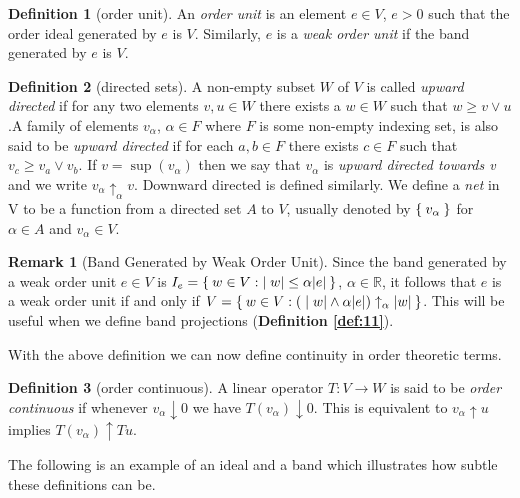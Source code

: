 \documentclass[letterpaper,10pt,oneside,onecolumn,reqno]{amsart}
\newcommand{\R}{\mathbb R}
\theoremstyle{definition}
\newtheorem{defn}{Definition}
\newtheorem{rem}{Remark}
\newcommand{\meet}{\wedge}
\newcommand{\join}{\vee}
\begin{document}
  \begin{defn}[order unit]\label{def:9}
    An \emph{order unit} is an element $e \in V$, $e
    > 0$ such that the order ideal generated by $e$ is $V$. Similarly,
    $e$ is a \emph{weak order unit} if the band
    generated by $e$ is $V$.
  \end{defn}
  \begin{defn}[directed sets]\label{def:10}
    A non-empty subset $W$ of $V$ is called \emph{upward directed} if for any two elements $v,u \in W$
    there exists a $w \in W$ such that $w \geq v \join u$.A family of
    elements $v_{\alpha}$, $\alpha \in F$ where $F$ is some non-empty
    indexing set, is also said to be \emph{upward directed} if for
    each $a,b \in F$ there exists $c \in F$ such that $v_c \geq v_a
    \join v_b$. If $v = \sup({v_\alpha})$ then we say that
    $v_{\alpha}$ is \emph{upward directed towards v} and we write
    $v_{\alpha}\uparrow_{\alpha} v$. Downward directed is defined
    similarly. We define a \emph{net} in V to be a function
    from a directed set $A$ to $V$, usually denoted by
    $\Set{v_{\alpha}}$ for $\alpha \in A$ and $v_{\alpha} \in V$.

    \begin{rem}[Band Generated by Weak Order Unit]\label{rem:3}
      Since the band generated by a weak order unit $e \in V$ is
      $I_{e} = \Set{w \in V: |w| \leq \alpha |e|}$, $\alpha \in \R$,
      it follows that $e$ is a weak order unit if and only if $V =
      \Set{w \in V : (|w| \meet \alpha |e|) \uparrow_{\alpha}
        |w|}$. This will be useful when we define band projections
      (\textbf{Definition \ref{def:11}}).
    \end{rem}
  \end{defn}

With the above definition we can now define continuity in order
theoretic terms.

\begin{defn}[order continuous]\label{def:13}
  A linear operator $T : V \to W$ is said to be \emph{order continuous} if whenever $v_{\alpha} \downarrow
  0$ we have $T(v_{\alpha}) \downarrow 0$. This is equivalent to
  $v_{\alpha} \uparrow u$ implies $T(v_{\alpha}) \uparrow Tu$.
\end{defn}

The following is an example of an ideal and a band which illustrates
how subtle these definitions can be. 
\end{document}
